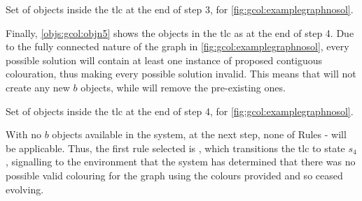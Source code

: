 \begin{cpobjectsfloat}
\begin{cpobjects}

    
    
    
        \cpobjectsline{\vdots}
        
    
    
\end{cpobjects}
\caption{\label{objs:gcol:objn4}Set of objects inside the \gls{tlc} at the end of step 3, for \cref{fig:gcol:examplegraphnosol}.}
\end{cpobjectsfloat}

Finally, \cref{objs:gcol:objn5} shows the objects in the \gls{tlc} as at the end of step 4.  Due to the fully connected nature of the graph in \cref{fig:gcol:examplegraphnosol}, every possible solution will contain at least one instance of proposed contiguous colouration, thus making every possible solution invalid.  This means that  will not create any new \(b\) objects, while  will remove the pre-existing ones.

\begin{cpobjectsfloat}
\begin{cpobjects}

    
\end{cpobjects}
\caption{\label{objs:gcol:objn5}Set of objects inside the \gls{tlc} at the end of step 4, for \cref{fig:gcol:examplegraphnosol}.}
\end{cpobjectsfloat}

With no \(b\) objects available in the system, at the next step, none of Rules - will be applicable.  Thus, the first rule selected is , which transitions the \gls{tlc} to state \(s_4\), signalling to the environment that the system has determined that there was no possible valid colouring for the graph using the colours provided and so ceased evolving.